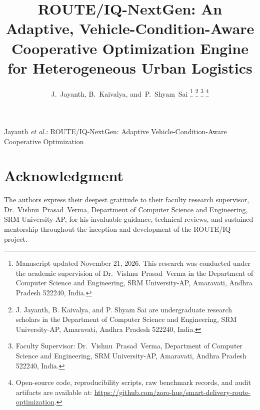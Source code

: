 \documentclass[journal,10pt]{IEEEtran}
\begin{document}
\title{ROUTE/IQ-NextGen: An Adaptive, Vehicle-Condition-Aware Cooperative Optimization Engine for Heterogeneous Urban Logistics}

\author{J.~Jayanth, 
        B.~Kaivalya, 
        and~P.~Shyam~Sai%
\thanks{Manuscript updated November 21, 2026. This research was conducted under the academic supervision of Dr.~Vishnu~Prasad~Verma in the Department of Computer Science and Engineering, SRM University-AP, Amaravati, Andhra Pradesh 522240, India.}%
\thanks{J. Jayanth, B. Kaivalya, and P. Shyam Sai are undergraduate research scholars in the Department of Computer Science and Engineering, SRM University-AP, Amaravati, Andhra Pradesh 522240, India.}%
\thanks{Faculty Supervisor: Dr.~Vishnu~Prasad~Verma, Department of Computer Science and Engineering, SRM University-AP, Amaravati, Andhra Pradesh 522240, India.}%
\thanks{Open-source code, reproducibility scripts, raw benchmark records, and audit artifacts are available at: \url{https://github.com/zoro-hue/smart-delivery-route-optimization}.}}

%
{Jayanth \MakeLowercase{\textit{et al.}}: ROUTE/IQ-NextGen: Adaptive Vehicle-Condition-Aware Cooperative Optimization}

\maketitle





















\section*{Acknowledgment}
The authors express their deepest gratitude to their faculty research supervisor, Dr.~Vishnu~Prasad~Verma, Department of Computer Science and Engineering, SRM University-AP, for his invaluable guidance, technical reviews, and sustained mentorship throughout the inception and development of the ROUTE/IQ project.



\end{document}

